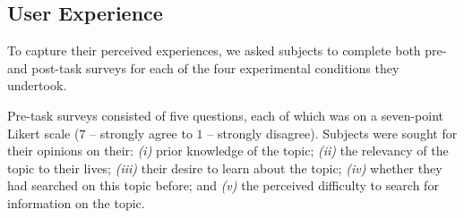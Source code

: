 \subsection{User Experience}\label{sec:method:experience}
To capture their perceived experiences, we asked subjects to complete both pre- and post-task surveys for each of the four experimental conditions they undertook.

Pre-task surveys consisted of five questions, each of which was on a seven-point Likert scale ($7$ -- strongly agree to $1$ -- strongly disagree). Subjects were sought for their opinions on their: \emph{(i)} prior knowledge of the topic; \emph{(ii)} the relevancy of the topic to their lives; \emph{(iii)} their desire to learn about the topic; \emph{(iv)} whether they had searched on this topic before; and \emph{(v)} the perceived difficulty to search for information on the topic.


